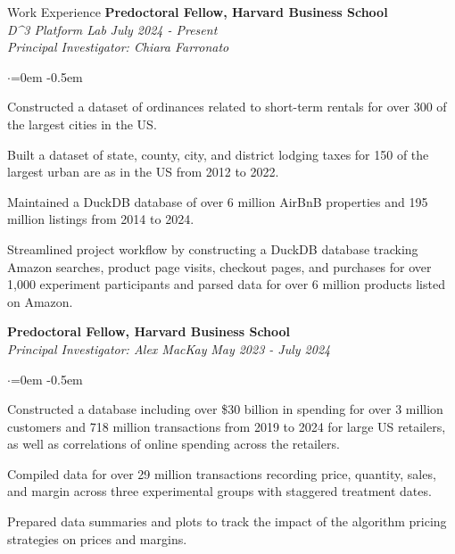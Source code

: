 \documentclass{resume} %
\begin{document}
\begin{rSection}{Work Experience}
{\bf Predoctoral Fellow, Harvard Business School } \\
  {\it D\textasciicircum 3 Platform Lab} \hfill {\textit{July 2024 - Present}} \\
	{\it Principal Investigator: Chiara Farronato} \\
	\vspace{-1em}
    \begin{list}{$\cdot$}{\leftmargin=0em} %
   \itemsep -0.5em \vspace{-0.5em} %
  {}
    \item Constructed a dataset of ordinances related to short-term rentals for over 300 of the largest cities in the US.
    \item Built a dataset of state, county, city, and district lodging taxes for 150 of the largest urban are as in the US from 2012 to 2022.
    \item Maintained a DuckDB database of over 6 million AirBnB properties and 195 million listings from 2014 to 2024.
    \item Streamlined project workflow by constructing a DuckDB database tracking Amazon searches, product page visits, checkout pages, and purchases for over 1,000 experiment participants and parsed data for over 6 million products listed on Amazon.
\end{list}

{\bf Predoctoral Fellow, Harvard Business School} \\
	{\it Principal Investigator: Alex MacKay} \hfill{\textit{May 2023 - July 2024}} \\
		\vspace{-1em}
    \begin{list}{$\cdot$}{\leftmargin=0em} %
   \itemsep -0.5em \vspace{-0.5em} %
  {}
    \item	Constructed a database including over \$30 billion in spending for over 3 million customers and 718 million transactions from 2019 to 2024 for large US retailers, as well as correlations of online spending across the retailers.
    \item Compiled data for over 29 million transactions recording price, quantity, sales, and margin across three experimental groups with staggered treatment dates.
    \item Prepared data summaries and plots to track the impact of the algorithm pricing strategies on prices and margins. 
	\end{list}


\end{rSection}
\end{document}
